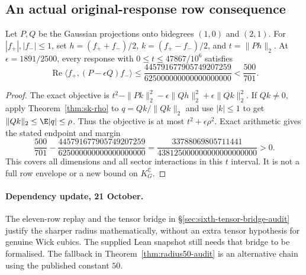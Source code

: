\subsection{An actual original-response row consequence}
\begin{corollary}[\st{P}+\st{C}]\label{cor:sk-row}
Let $P,Q$ be the Gaussian projections onto bidegrees $(1,0)$ and $(2,1)$. For $|f_+|,|f_-|\le1$, set $h=(f_++f_-)/2$, $k=(f_+-f_-)/2$, and $t=\|Ph\|_2$. At $\epsilon=1891/2500$, every response with $0\le t\le47867/10^6$ satisfies
\[
 \operatorname{Re}\langle f_+,(P-\epsilon Q)f_-\rangle
 \le\frac{445791677905749207259}{625000000000000000000}<\frac{500}{701}.
\]
\end{corollary}
\begin{proof}
The exact objective is $t^2-\|Pk\|_2^2-\epsilon\|Qh\|_2^2+\epsilon\|Qk\|_2^2$. If $Qk\ne0$, apply Theorem~\ref{thm:sk-rho} to $q=Qk/\|Qk\|_2$ and use $|k|\le1$ to get $\|Qk\|_2\le\E|q|\le\rho$. Thus the objective is at most $t^2+\epsilon\rho^2$. Exact arithmetic gives the stated endpoint and margin
\[
 \frac{500}{701}-\frac{445791677905749207259}{625000000000000000000}
 =\frac{33788069805711441}{438125000000000000000000}>0.
\]
This covers all dimensions and all sector interactions in this $t$ interval. It is not a full row envelope or a new bound on $K_G^{\mathbb C}$.
\end{proof}

\paragraph{Dependency update, 21 October.}
The eleven-row replay and the tensor bridge in
\S\ref{sec:sixth-tensor-bridge-audit} justify the sharper radius
mathematically, without an extra tensor hypothesis for genuine Wick
cubics. The supplied Lean snapshot still needs that bridge to be
formalised. The fallback in Theorem~\ref{thm:radius50-audit} is an
alternative chain using the published constant $50$.



